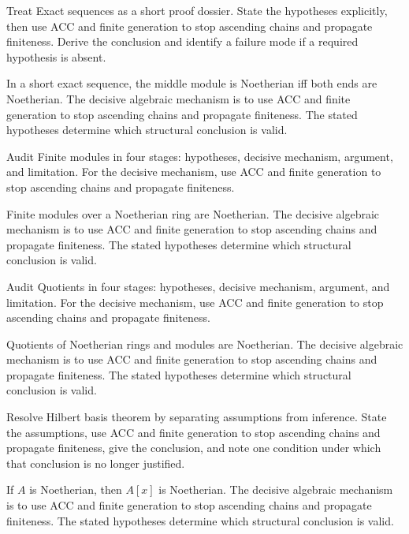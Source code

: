 \begin{problem}\label{prob:v15-problem-04}
Treat Exact sequences as a short proof dossier. State the hypotheses explicitly, then use ACC and finite generation to stop ascending chains and propagate finiteness. Derive the conclusion and identify a failure mode if a required hypothesis is absent.
\end{problem}
\begin{solution}
In a short exact sequence, the middle module is Noetherian iff both ends are Noetherian. The decisive algebraic mechanism is to use ACC and finite generation to stop ascending chains and propagate finiteness. The stated hypotheses determine which structural conclusion is valid.
\end{solution}

\begin{problem}\label{prob:v15-problem-05}
Audit Finite modules in four stages: hypotheses, decisive mechanism, argument, and limitation. For the decisive mechanism, use ACC and finite generation to stop ascending chains and propagate finiteness.
\end{problem}
\begin{solution}
Finite modules over a Noetherian ring are Noetherian. The decisive algebraic mechanism is to use ACC and finite generation to stop ascending chains and propagate finiteness. The stated hypotheses determine which structural conclusion is valid.
\end{solution}

\begin{problem}\label{prob:v15-problem-06}
Audit Quotients in four stages: hypotheses, decisive mechanism, argument, and limitation. For the decisive mechanism, use ACC and finite generation to stop ascending chains and propagate finiteness.
\end{problem}
\begin{solution}
Quotients of Noetherian rings and modules are Noetherian. The decisive algebraic mechanism is to use ACC and finite generation to stop ascending chains and propagate finiteness. The stated hypotheses determine which structural conclusion is valid.
\end{solution}

\begin{problem}\label{prob:v15-problem-07}
Resolve Hilbert basis theorem by separating assumptions from inference. State the assumptions, use ACC and finite generation to stop ascending chains and propagate finiteness, give the conclusion, and note one condition under which that conclusion is no longer justified.
\end{problem}
\begin{solution}
If $A$ is Noetherian, then $A[x]$ is Noetherian. The decisive algebraic mechanism is to use ACC and finite generation to stop ascending chains and propagate finiteness. The stated hypotheses determine which structural conclusion is valid.
\end{solution}

